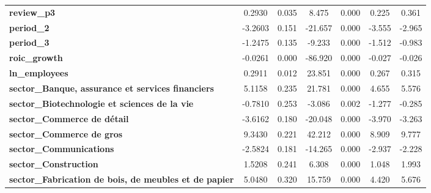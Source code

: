 \begin{center}
\begin{tabular}{lcccccc}
\textbf{review\_p3}                                                   &       0.2930  &        0.035     &     8.475  &         0.000        &        0.225    &        0.361     \\
\textbf{period\_2}                                                    &      -3.2603  &        0.151     &   -21.657  &         0.000        &       -3.555    &       -2.965     \\
\textbf{period\_3}                                                    &      -1.2475  &        0.135     &    -9.233  &         0.000        &       -1.512    &       -0.983     \\
\textbf{roic\_growth}                                                 &      -0.0261  &        0.000     &   -86.920  &         0.000        &       -0.027    &       -0.026     \\
\textbf{ln\_employees}                                                &       0.2911  &        0.012     &    23.851  &         0.000        &        0.267    &        0.315     \\
\textbf{sector\_Banque, assurance et services financiers}             &       5.1158  &        0.235     &    21.781  &         0.000        &        4.655    &        5.576     \\
\textbf{sector\_Biotechnologie et sciences de la vie}                 &      -0.7810  &        0.253     &    -3.086  &         0.002        &       -1.277    &       -0.285     \\
\textbf{sector\_Commerce de détail}                                   &      -3.6162  &        0.180     &   -20.048  &         0.000        &       -3.970    &       -3.263     \\
\textbf{sector\_Commerce de gros}                                     &       9.3430  &        0.221     &    42.212  &         0.000        &        8.909    &        9.777     \\
\textbf{sector\_Communications}                                       &      -2.5824  &        0.181     &   -14.265  &         0.000        &       -2.937    &       -2.228     \\
\textbf{sector\_Construction}                                         &       1.5208  &        0.241     &     6.308  &         0.000        &        1.048    &        1.993     \\
\textbf{sector\_Fabrication de bois, de meubles et de papier}         &       5.0480  &        0.320     &    15.759  &         0.000        &        4.420    &        5.676     \\

\end{tabular}
\end{center}

